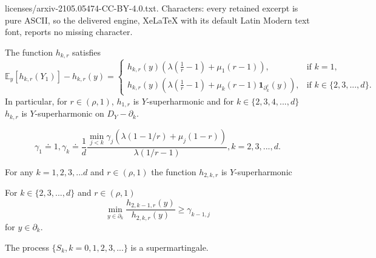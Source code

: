 \documentclass[10pt,a4paper]{amsart}
\begin{document}
licenses/arxiv-2105.05474-CC-BY-4.0.txt. Characters: every retained excerpt is pure ASCII, so the delivered engine, XeLaTeX with its default Latin Modern text font, reports no missing character.
\begin{proposition}\label{p:hkr}
The function $h_{k,r}$ satisfies
\begin{equation}\label{e:howsuperharmonic}
{\mathbb E}_y[h_{k,r}(Y_1)] -h_{k,r}(y) =
\begin{cases}
h_{k,r}(y) \left(
\lambda \left(\frac{1}{r}-1\right) + \mu_1 (r-1)\right), &\text{if } k=1,\\
h_{k,r}(y) \left(
\lambda \left(\frac{1}{r}-1\right) + \mu_k (r-1) {\bm 1}_{\partial_k^c}(y)\right),
&\text{if } k \in \{2,3,...,d\}.
\end{cases}
\end{equation}
In particular, for $r \in (\rho,1)$,  $h_{1,r}$ is $Y$-superharmonic and for 
$k \in \{2,3,4,...,d\}$ $h_{k,r}$ is $Y$-superharmonic on $D_Y - \partial_k.$
\end{proposition}

\begin{equation}\label{d:gamma}
\gamma_1 \doteq 1, 
\gamma_k \doteq \frac{1}{d}\frac{\min_{j < k}\gamma_j(\lambda(1 -1/r) + \mu_{j}(1-r))}{\lambda(1/r - 1) }, k=2,3,...,d.
\end{equation}

\begin{proposition}\label{p:Ysuperharmonicfuns}
For any $k=1,2,3,...d$ and $r \in (\rho,1)$
the function $h_{2,k,r}$ is $Y$-superharmonic
\end{proposition}

\begin{lemma}\label{l:inequalityoverjumps}
For $k \in \{2,3,...,d\}$  and $r \in (\rho,1)$
\begin{equation}\label{e:lowerboundonratio}
\min_{y \in \partial_{k}} \frac{h_{2,k-1,r}(y)}{h_{2,k,r}(y)} \ge 
\gamma_{k-1,j}
\end{equation}
for $y \in \partial_{k}.$
\end{lemma}

\begin{proposition}
The process $\{S_k, k=0,1,2,3,...\}$ is a supermartingale.
\end{proposition}
\end{document}

